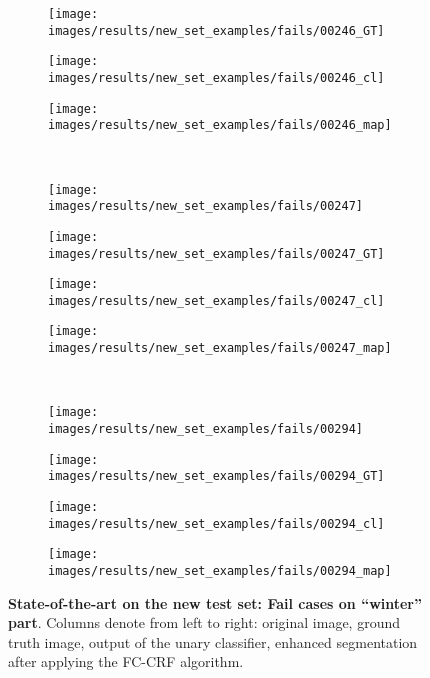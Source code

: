 \begin{figure}[t]
\begin{subfigure}[c]{0.24\textwidth}
  \texttt{[image: images/results/new\_set\_examples/fails/00246\_GT]}
 \end{subfigure}
 \begin{subfigure}[c]{0.24\textwidth}
  \centering
  \texttt{[image: images/results/new\_set\_examples/fails/00246\_cl]}
 \end{subfigure}
 \begin{subfigure}[c]{0.24\textwidth}
  \centering
  \texttt{[image: images/results/new\_set\_examples/fails/00246\_map]}
 \end{subfigure}
 \\
 \begin{subfigure}[c]{0.24\textwidth}
  \centering
  \texttt{[image: images/results/new\_set\_examples/fails/00247]}
 \end{subfigure}
 \begin{subfigure}[c]{0.24\textwidth}
  \centering
  \texttt{[image: images/results/new\_set\_examples/fails/00247\_GT]}
 \end{subfigure}
 \begin{subfigure}[c]{0.24\textwidth}
  \centering
  \texttt{[image: images/results/new\_set\_examples/fails/00247\_cl]}
 \end{subfigure}
 \begin{subfigure}[c]{0.24\textwidth}
  \centering
  \texttt{[image: images/results/new\_set\_examples/fails/00247\_map]}
 \end{subfigure}
 \\
 \begin{subfigure}[c]{0.24\textwidth}
  \centering
  \texttt{[image: images/results/new\_set\_examples/fails/00294]}
 \end{subfigure}
 \begin{subfigure}[c]{0.24\textwidth}
  \centering
  \texttt{[image: images/results/new\_set\_examples/fails/00294\_GT]}
 \end{subfigure}
 \begin{subfigure}[c]{0.24\textwidth}
  \centering
  \texttt{[image: images/results/new\_set\_examples/fails/00294\_cl]}
 \end{subfigure}
 \begin{subfigure}[c]{0.24\textwidth}
  \centering
  \texttt{[image: images/results/new\_set\_examples/fails/00294\_map]}
 \end{subfigure}
 \caption[State-of-the-art on the new test set: Fail cases on ``winter'' part]{
 {\bf State-of-the-art on the new test set: Fail cases on ``winter'' part}.
 Columns denote from left to right: original image, ground truth image, output of the unary classifier, enhanced segmentation after applying
 the FC-CRF algorithm.}\label{fig:fc_crf_fails_winter}
\end{figure}

